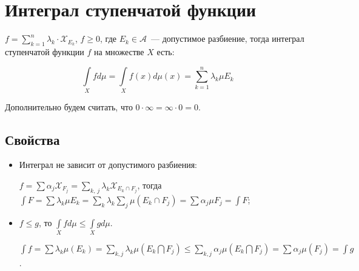 \documentclass{article}
\begin{document}
\newcommand{\R}[0]{\mathbb{R}}
\newcommand{\RM}[0]{\mathbb{R}^m}
\newcommand{\dist}[0]{\mathrm{dist}}
\newcommand{\rang}[0]{\mathrm{rang} $\ $}
\newcommand{\grad}[0]{\mathrm{grad} $\ $}
\newcommand{\Lin}[0]{\mathrm{Lin} $\ $}

\tableofcontents

\newpage

    \section{Интеграл ступенчатой функции}
    
        $f = \sum\limits_{k = 1}^n \lambda_k \cdot \mathcal{X}_{E_k}$, $f \geqslant 0$, где $E_k \in \mathcal{A}$~--- допустимое разбиение, тогда интеграл ступенчатой функции $f$ на множестве $X$ есть:
                
        $$\int\limits_{X} f d \mu = \int\limits_{X} f(x) d \mu(x) = \sum\limits_{k = 1}^n \lambda_k \mu E_k$$
        
        Дополнительно будем считать, что $0 \cdot \infty = \infty \cdot 0 = 0$.
                
        \subsection{Свойства}
                
            \begin{itemize}
                
                \item Интеграл не зависит от допустимого разбиения:
                    
                    $f = \sum \alpha_j \mathcal{X}_{F_j} = \sum\limits_{k,\, j} \lambda_k \mathcal{X}_{E_k \cap F_j}$, тогда $\int F = \sum \lambda_k \mu E_k = \sum\limits_{k} \lambda_k \sum\limits_j \mu (E_k \cap F_j) = \sum \alpha_j \mu F_j = \int F$;
                        
                \item $f \leqslant g$, то $\int\limits_{X} f d \mu \leqslant \int\limits_{X} g d \mu$.
                
                    $\int f = \sum \lambda_k \mu (E_k) = \sum\limits_{k, j} \lambda_k \mu (E_k \bigcap F_j) \leqslant \sum\limits_{k, j} \alpha_j \mu(E_k \bigcap F_j) = \sum \alpha_j \mu (F_j) = \int g$.
                    
            \end{itemize}
            
\end{document}
